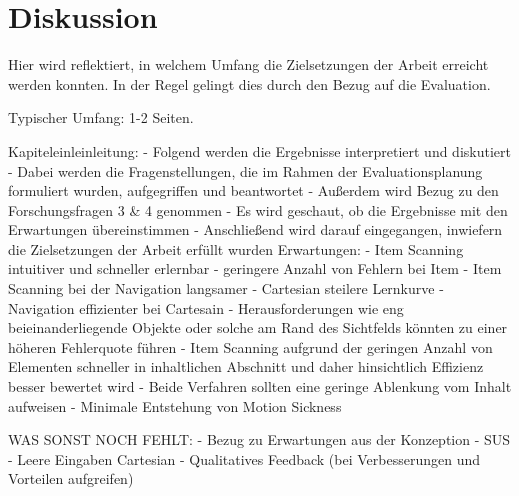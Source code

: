 \chapter{Diskussion}

Hier wird reflektiert, in welchem Umfang die Zielsetzungen der Arbeit erreicht werden konnten. In der Regel gelingt dies durch den Bezug auf die Evaluation.

Typischer Umfang: 1-2 Seiten.

Kapiteleinleinleitung:
-	Folgend werden die Ergebnisse interpretiert und diskutiert
-	Dabei werden die Fragenstellungen, die im Rahmen der Evaluationsplanung formuliert wurden, aufgegriffen und beantwortet 
-	Außerdem wird Bezug zu den Forschungsfragen 3 \& 4 genommen 
-	Es wird geschaut, ob die Ergebnisse mit den Erwartungen übereinstimmen 
-	Anschließend wird darauf eingegangen, inwiefern die Zielsetzungen der Arbeit erfüllt wurden 
Erwartungen:
-	 Item Scanning intuitiver und schneller erlernbar
-	geringere Anzahl von Fehlern bei Item 
-	Item Scanning bei der Navigation langsamer
-	Cartesian steilere Lernkurve
-	Navigation effizienter bei Cartesain
-	Herausforderungen wie eng beieinanderliegende Objekte oder solche am Rand des Sichtfelds könnten zu einer höheren Fehlerquote führen
-	Item Scanning aufgrund der geringen Anzahl von Elementen schneller in inhaltlichen Abschnitt und daher hinsichtlich Effizienz besser bewertet wird
-	Beide Verfahren sollten eine geringe Ablenkung vom Inhalt aufweisen
-	Minimale Entstehung von Motion Sickness 

WAS SONST NOCH FEHLT:
-	Bezug zu Erwartungen aus der Konzeption 
-	SUS 
-	Leere Eingaben Cartesian 
-	Qualitatives Feedback (bei Verbesserungen und Vorteilen aufgreifen) 

